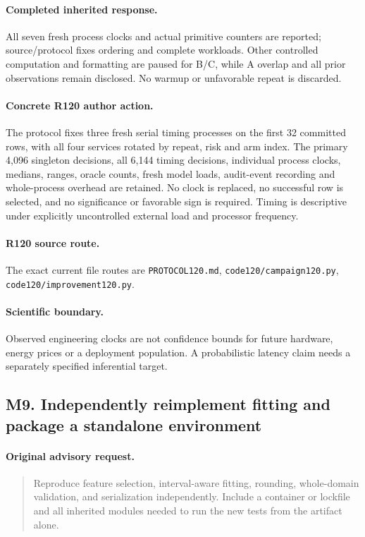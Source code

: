 \paragraph{Completed inherited response.}
All seven fresh process clocks and actual primitive counters are reported; source/protocol fixes ordering and complete workloads. Other controlled computation and formatting are paused for B/C, while A overlap and all prior observations remain disclosed. No warmup or unfavorable repeat is discarded.
\paragraph{Concrete R120 author action.}
The protocol fixes three fresh serial timing processes on the first 32 committed rows, with all four services rotated by repeat, risk and arm index. The primary 4,096 singleton decisions, all 6,144 timing decisions, individual process clocks, medians, ranges, oracle counts, fresh model loads, audit-event recording and whole-process overhead are retained. No clock is replaced, no successful row is selected, and no significance or favorable sign is required. Timing is descriptive under explicitly uncontrolled external load and processor frequency.
\paragraph{R120 source route.}
The exact current file routes are \nolinkurl{PROTOCOL120.md}, \nolinkurl{code120/campaign120.py}, \nolinkurl{code120/improvement120.py}.
\paragraph{Scientific boundary.}
Observed engineering clocks are not confidence bounds for future hardware, energy prices or a deployment population. A probabilistic latency claim needs a separately specified inferential target.

\subsection{M9. Independently reimplement fitting and package a standalone environment}
\label{response120:M9}
\paragraph{Original advisory request.}
\begin{quote}
Reproduce feature selection, interval-aware fitting, rounding, whole-domain validation, and serialization independently. Include a container or lockfile and all inherited modules needed to run the new tests from the artifact alone.
\end{quote}
